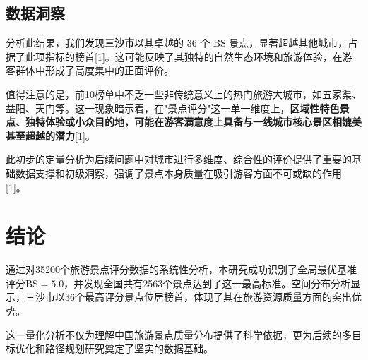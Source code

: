 \documentclass[12pt]{article}
\newcommand{\BS}{\text{BS}}
\begin{document}
\subsection{数据洞察}

分析此结果，我们发现\textbf{三沙市}以其卓越的 36 个 $\BS$ 景点，显著超越其他城市，占据了此项指标的榜首[1]。这可能反映了其独特的自然生态环境和旅游体验，在游客群体中形成了高度集中的正面评价。

值得注意的是，前10榜单中不乏一些非传统意义上的热门旅游大城市，如五家渠、益阳、天门等。这一现象暗示着，在"景点评分"这一单一维度上，\textbf{区域性特色景点、独特体验或小众目的地，可能在游客满意度上具备与一线城市核心景区相媲美甚至超越的潜力}[1]。

此初步的定量分析为后续问题中对城市进行多维度、综合性的评价提供了重要的基础数据支撑和初级洞察，强调了景点本身质量在吸引游客方面不可或缺的作用[1]。

\section{结论}

通过对35200个旅游景点评分数据的系统性分析，本研究成功识别了全局最优基准评分$\BS = 5.0$，并发现全国共有2563个景点达到了这一最高标准。空间分布分析显示，三沙市以36个最高评分景点位居榜首，体现了其在旅游资源质量方面的突出优势。

这一量化分析不仅为理解中国旅游景点质量分布提供了科学依据，更为后续的多目标优化和路径规划研究奠定了坚实的数据基础。
\end{document}
